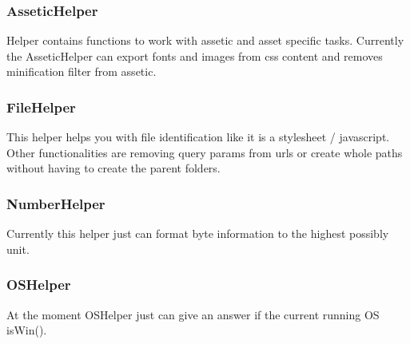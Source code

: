 \noindent
\begin{minipage}{\textwidth}
\vspace{1.5em}
\subsubsection{AsseticHelper}
Helper contains functions to work with assetic and asset specific tasks. Currently the AsseticHelper can export fonts and images from css content and removes minification filter from assetic.
\end{minipage}

\noindent
\begin{minipage}{\textwidth}
\vspace{1.5em}
\subsubsection{FileHelper}
This helper helps you with file identification like it is a stylesheet / javascript. Other functionalities are removing query params from urls or create whole paths without having to create the parent folders.
\end{minipage}

\noindent
\begin{minipage}{\textwidth}
\vspace{1.5em}
\subsubsection{NumberHelper}
Currently this helper just can format byte information to the highest possibly unit.
\end{minipage}

\noindent
\begin{minipage}{\textwidth}
\vspace{1.5em}
\subsubsection{OSHelper}
At the moment OSHelper just can give an answer if the current running OS isWin().
\end{minipage}

